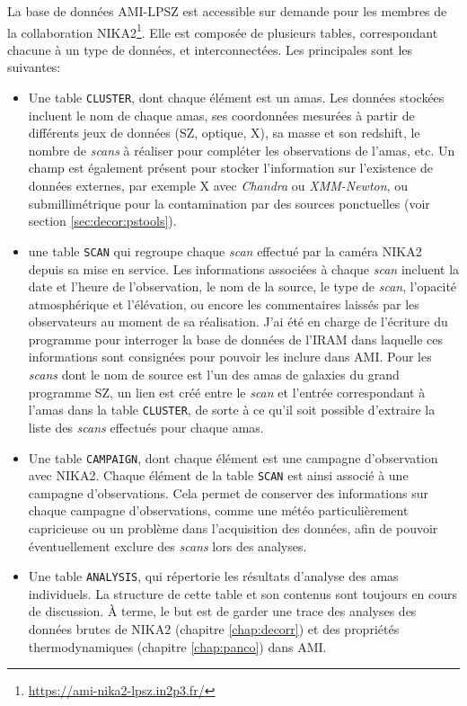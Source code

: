 La base de données AMI-LPSZ est accessible sur demande pour les membres de la collaboration NIKA2\footnote{\url{https://ami-nika2-lpsz.in2p3.fr/}}.
Elle est composée de plusieurs tables, correspondant chacune à un type de données, et interconnectées.
Les principales sont les suivantes:
\begin{itemize}[leftmargin=*]
\setlength\itemsep{0pt}
\item Une table \texttt{CLUSTER}, dont chaque élément est un amas.
    Les données stockées incluent le nom de chaque amas, ses coordonnées mesurées à partir de différents jeux de données (SZ, optique, X), sa masse et son redshift, le nombre de \textit{scans} à réaliser pour compléter les observations de l'amas, etc.
    Un champ est également présent pour stocker l'information sur l'existence de données externes, par exemple X avec \textit{Chandra} ou \textit{XMM-Newton}, ou submillimétrique pour la contamination par des sources ponctuelles (voir section \ref{sec:decor:pstools}).
\item une table \texttt{SCAN} qui regroupe chaque \textit{scan} effectué par la caméra NIKA2 depuis sa mise en service.
    Les informations associées à chaque \textit{scan} incluent la date et l'heure de l'observation, le nom de la source, le type de \textit{scan}, l'opacité atmosphérique et l'élévation, ou encore les commentaires laissés par les observateurs au moment de sa réalisation.
    J'ai été en charge de l'écriture du programme pour interroger la base de données de l'IRAM dans laquelle ces informations sont consignées pour pouvoir les inclure dans AMI.
    Pour les \textit{scans} dont le nom de source est l'un des amas de galaxies du grand programme SZ, un lien est créé entre le \textit{scan} et l'entrée correspondant à l'amas dans la table \texttt{CLUSTER}, de sorte à ce qu'il soit possible d'extraire la liste des \textit{scans} effectués pour chaque amas.
\item Une table \texttt{CAMPAIGN}, dont chaque élément est une campagne d'observation avec NIKA2.
    Chaque élément de la table \texttt{SCAN} est ainsi associé à une campagne d'observations.
    Cela permet de conserver des informations sur chaque campagne d'observations, comme une météo particulièrement capricieuse ou un problème dans l'acquisition des données, afin de pouvoir éventuellement exclure des \textit{scans} lors des analyses.
\item Une table \texttt{ANALYSIS}, qui répertorie les résultats d'analyse des amas individuels.
    La structure de cette table et son contenus sont toujours en cours de discussion.
    À terme, le but est de garder une trace des analyses des données brutes de NIKA2 (chapitre \ref{chap:decorr}) et des propriétés thermodynamiques (chapitre \ref{chap:panco}) dans AMI.
\end{itemize}

